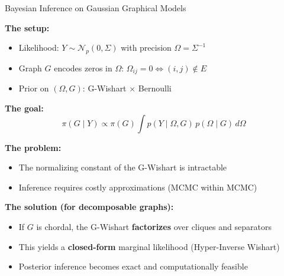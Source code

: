 \begin{frame}{Bayesian Inference on Gaussian Graphical Models}

\textbf{The setup:}
\begin{itemize}
    \item Likelihood: $Y \sim \mathcal{N}_p(0, \Sigma)$ with precision $\Omega = \Sigma^{-1}$
    \item Graph $G$ encodes zeros in $\Omega$: $\Omega_{ij}=0 \iff (i,j) \notin E$
    \item Prior on $(\Omega, G)$: G-Wishart $\times$ Bernoulli
\end{itemize}


\textbf{The goal:}
\[
\pi(G \mid Y) \propto \pi(G) \int p(Y \mid \Omega, G) \, p(\Omega \mid G) \, d\Omega
\]

\textbf{The problem:}
\begin{center}
\end{center}
\begin{itemize}
    \item The normalizing constant of the G-Wishart is intractable
    \item Inference requires costly approximations (MCMC within MCMC)
\end{itemize}

\textbf{The solution (for decomposable graphs):}
\begin{itemize}
    \item If $G$ is chordal, the G-Wishart \textbf{factorizes} over cliques and separators
    \item This yields a \textbf{closed-form} marginal likelihood (Hyper-Inverse Wishart)
    \item Posterior inference becomes exact and computationally feasible
\end{itemize}

\end{frame}
